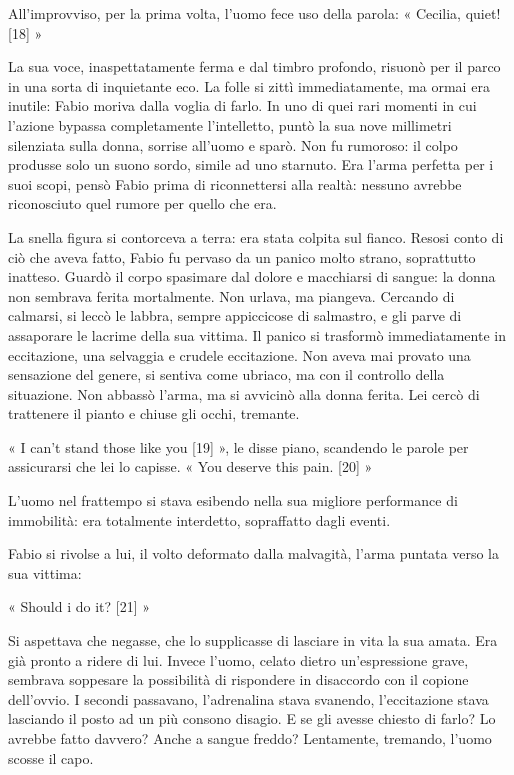All'improvviso, per la prima volta, l'uomo fece uso della parola: « Cecilia, quiet! [18] »

La sua voce, inaspettatamente ferma e dal timbro profondo, risuonò per il parco in una sorta di inquietante eco. La folle si zittì immediatamente, ma ormai era inutile: Fabio moriva dalla voglia di farlo. In uno di quei rari momenti in cui l'azione bypassa completamente l'intelletto, puntò la sua nove millimetri silenziata sulla donna, sorrise all'uomo e sparò. Non fu rumoroso: il colpo produsse solo un suono sordo, simile ad uno starnuto. Era l'arma perfetta per i suoi scopi, pensò Fabio prima di riconnettersi alla realtà: nessuno avrebbe riconosciuto quel rumore per quello che era.

La snella figura si contorceva a terra: era stata colpita sul fianco. Resosi conto di ciò che aveva fatto, Fabio fu pervaso da un panico molto strano, soprattutto inatteso. Guardò il corpo spasimare dal dolore e macchiarsi di sangue: la donna non sembrava ferita mortalmente. Non urlava, ma piangeva. Cercando di calmarsi, si leccò le labbra, sempre appiccicose di salmastro, e gli parve di assaporare le lacrime della sua vittima. Il panico si trasformò immediatamente in eccitazione, una selvaggia e crudele eccitazione. Non aveva mai provato una sensazione del genere, si sentiva come ubriaco, ma con il controllo della situazione. Non abbassò l'arma, ma si avvicinò alla donna ferita. Lei cercò di trattenere il pianto e chiuse gli occhi, tremante.

« I can't stand those like you [19] », le disse piano, scandendo le parole per assicurarsi che lei lo capisse. « You deserve this pain. [20] »

L'uomo nel frattempo si stava esibendo nella sua migliore performance di immobilità: era totalmente interdetto, sopraffatto dagli eventi.

Fabio si rivolse a lui, il volto deformato dalla malvagità, l'arma puntata verso la sua vittima:

« Should i do it? [21] »

Si aspettava che negasse, che lo supplicasse di lasciare in vita la sua amata. Era già pronto a ridere di lui. Invece l'uomo, celato dietro un'espressione grave, sembrava soppesare la possibilità di rispondere in disaccordo con il copione dell'ovvio. I secondi passavano, l'adrenalina stava svanendo, l'eccitazione stava lasciando il posto ad un più consono disagio. E se gli avesse chiesto di farlo? Lo avrebbe fatto davvero? Anche a sangue freddo? Lentamente, tremando, l'uomo scosse il capo.


